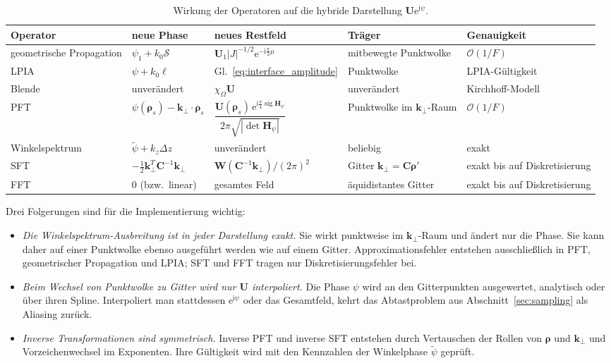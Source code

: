 \documentclass[11pt,a4paper]{scrartcl}
\theoremstyle{insightstyle}
\newcommand{\ii}{\mathrm{i}}
\newcommand{\ee}{\mathrm{e}}
\newcommand{\Hess}{\bm{H}}
\newcommand{\rh}{\bm{\rho}}
\newcommand{\kp}{\bm{k}_\perp}
\newcommand{\Sc}{\mathcal{S}}
\DeclareMathOperator{\sig}{sig}
\begin{document}
\begin{table}[htbp]
\centering
\renewcommand{\arraystretch}{1.3}
\small
\begin{tabularx}{\textwidth}{>{\raggedright\arraybackslash}p{2.6cm} >{\raggedright\arraybackslash}X >{\raggedright\arraybackslash}X >{\raggedright\arraybackslash}p{2.4cm} >{\raggedright\arraybackslash}p{2.3cm}}
\toprule
Operator & neue Phase & neues Restfeld & Träger & Genauigkeit\\
\midrule
geometrische Propagation & $\psi_1+k_0\Sc$ & $\bm U_1|J|^{-1/2}\ee^{-\ii\frac\pi2\mu}$ & mitbewegte Punktwolke & $\mathcal O(1/F)$\\
\addlinespace
LPIA & $\psi+k_0\ell$ & Gl.~\eqref{eq:interface_amplitude} & Punktwolke & LPIA-Gültigkeit\\
\addlinespace
Blende & unverändert & $\chi_\Omega\bm U$ & unverändert & Kirchhoff-Modell\\
\addlinespace
PFT & $\psi(\rh_s)-\kp\cdot\rh_s$ & $\dfrac{\bm U(\rh_s)\,\ee^{\ii\frac\pi4\sig\Hess_\psi}}{2\pi\sqrt{|\det\Hess_\psi|}}$ & Punktwolke im $\kp$-Raum & $\mathcal O(1/F)$\\
\addlinespace
Winkelspektrum & $\tilde\psi+k_z\Delta z$ & unverändert & beliebig & exakt\\
\addlinespace
SFT & $-\frac12\kp^T\bm C^{-1}\kp$ & $\bm W(\bm C^{-1}\kp)/(2\pi)^2$ & Gitter $\kp=\bm C\rh'$ & exakt bis auf Diskretisierung\\
\addlinespace
FFT & $0$ (bzw.\ linear) & gesamtes Feld & äquidistantes Gitter & exakt bis auf Diskretisierung\\
\bottomrule
\end{tabularx}
\caption{Wirkung der Operatoren auf die hybride Darstellung $\bm U\ee^{\ii\psi}$.}
\label{tab:chaining}
\end{table}

Drei Folgerungen sind für die Implementierung wichtig:
\begin{itemize}
    \item \emph{Die Winkelspektrum-Ausbreitung ist in jeder Darstellung exakt.} Sie wirkt punktweise im $\kp$-Raum und ändert nur die Phase. Sie kann daher auf einer Punktwolke ebenso ausgeführt werden wie auf einem Gitter. Approximationsfehler entstehen ausschließlich in PFT, geometrischer Propagation und LPIA; SFT und FFT tragen nur Diskretisierungsfehler bei.
    \item \emph{Beim Wechsel von Punktwolke zu Gitter wird nur $\bm U$ interpoliert.} Die Phase $\psi$ wird an den Gitterpunkten ausgewertet, analytisch oder über ihren Spline. Interpoliert man stattdessen $\ee^{\ii\psi}$ oder das Gesamtfeld, kehrt das Abtastproblem aus Abschnitt~\ref{sec:sampling} als Aliasing zurück.
    \item \emph{Inverse Transformationen sind symmetrisch.} Inverse PFT und inverse SFT entstehen durch Vertauschen der Rollen von $\rh$ und $\kp$ und Vorzeichenwechsel im Exponenten. Ihre Gültigkeit wird mit den Kennzahlen der Winkelphase $\tilde\psi$ geprüft.
\end{itemize}
\end{document}
